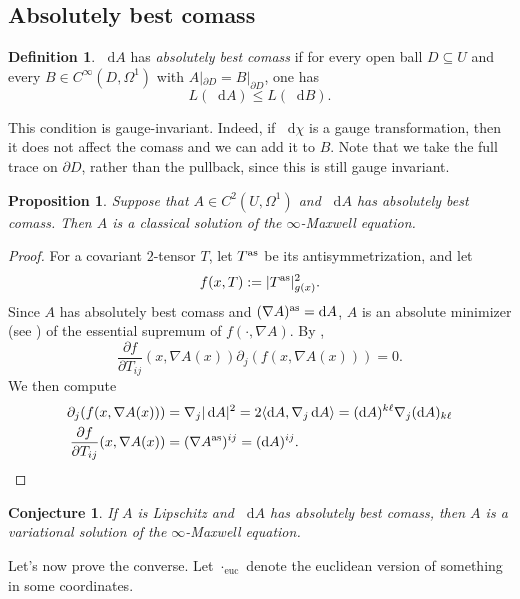 \documentclass[reqno,11pt]{amsart}
\newcommand*\dif{\mathop{}\!\mathrm{d}}
\newcommand{\dfn}[1]{\emph{#1}\index{#1}}
\newcommand{\euc}{\mathrm{euc}}
\newtheorem{proposition}[theorem]{Proposition}
\newtheorem{conjecture}[theorem]{Conjecture}
\theoremstyle{definition}
\newtheorem{definition}[theorem]{Definition}
\numberwithin{equation}{section}
\begin{document}
\subsection{Absolutely best comass}
\begin{definition}
$\dif A$ has \dfn{absolutely best comass} if for every open ball $D \subseteq U$ and every $B \in C^\infty(D, \Omega^1)$ with $A|_{\partial D} = B|_{\partial D}$,
one has
$$L(\dif A) \leq L(\dif B).$$
\end{definition}

This condition is gauge-invariant.
Indeed, if $\dif \chi$ is a gauge transformation, then it does not affect the comass and we can add it to $B$.
Note that we take the full trace on $\partial D$, rather than the pullback, since this is still gauge invariant.

\begin{proposition}
Suppose that $A \in C^2(U, \Omega^1)$ and $\dif A$ has absolutely best comass.
Then $A$ is a classical solution of the $\infty$-Maxwell equation.
\end{proposition}
\begin{proof}
For a covariant $2$-tensor $T$, let $T^{\rm as}$ be its antisymmetrization, and let
$$f(x, T) := |T^{\rm as}|_{g(x)}^2.$$
Since $A$ has absolutely best comass and $(\nabla A)^{\rm as} = \dif A$, $A$ is an absolute minimizer (see \cite[Definition 5.1]{Barron2001}) of the essential supremum of $f(\cdot, \nabla A)$.
By \cite[Theorem 5.2]{Barron2001},
\begin{equation}\label{ELA}
	\frac{\partial f}{\partial T_{ij}}(x, \nabla A(x)) \partial_j (f(x, \nabla A(x))) = 0.
\end{equation}
We then compute
\begin{align*}
\partial_j (f(x, \nabla A(x))) &= \nabla_j |\dif A|^2 = 2 \langle \dif A, \nabla_j \dif A\rangle = (\dif A)^{k\ell} \nabla_j (\dif A)_{k\ell} \\
\frac{\partial f}{\partial T_{ij}}(x, \nabla A(x)) &= (\nabla A^{\rm as})^{ij} = (\dif A)^{ij}. \qedhere
\end{align*}
\end{proof}

\begin{conjecture}
If $A$ is Lipschitz and $\dif A$ has absolutely best comass, then $A$ is a variational solution of the $\infty$-Maxwell equation.
\end{conjecture}

Let's now prove the converse.
Let $\cdot_\euc$ denote the euclidean version of something in some coordinates.
\end{document}
